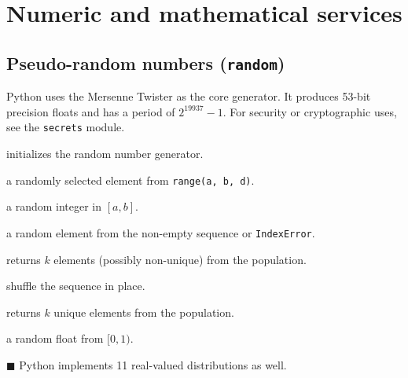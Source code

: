 \section{Numeric and mathematical services}
\subsection{Pseudo-random numbers (\texttt{random})}
Python uses the Mersenne Twister as the core generator. It produces 53-bit precision floats and has a period of $2^{19937}-1$.
For security or cryptographic uses, see the \texttt{secrets} module.

\begin{compactitem}
	\item {} initializes the random number generator.
	\item {} a randomly selected element from \texttt{range(a, b, d)}.
	\item {} a random integer in $[a, b]$.
	\item {} a random element from the non-empty sequence or \texttt{IndexError}.
	\item {} returns $k$ elements (possibly non-unique) from the population.
	\item {} shuffle the sequence in place.
	\item {} returns $k$ unique elements from the population.
	\item {} a random float from $[0, 1)$.
	\item [$\blacksquare$]Python implements 11 real-valued distributions as well.
\end{compactitem}